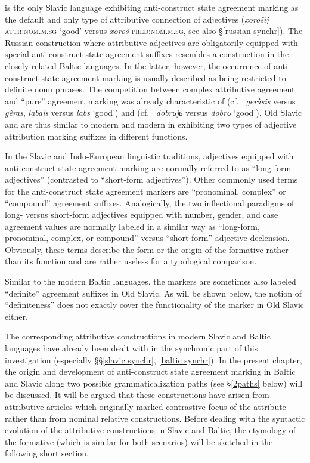  is the only Slavic language exhibiting anti\hyp{}construct state agreement marking as the default and only type of attributive connection of adjectives (\textit{xorošij} \textsc{attr:nom.m.sg} ‘good’ versus \textit{xoroš} \textsc{pred:nom.m.sg}, see also \S\ref{russian synchr}). The Russian construction where attributive adjectives are obligatorily equipped with special anti\hyp{}construct state agreement suffixes resembles a construction in the closely related Baltic languages. In the latter, however, the occurrence of anti\hyp{}construct state agreement marking is usually described as being restricted to definite noun phrases. The competition between complex attributive agreement and “pure” agreement marking was already characteristic of  (cf.~ \textit{geràsis} versus \textit{g{\~e}ras},  \textit{labais} versus \textit{labs} ‘good’) and  (cf.~ \textit{dobrъjь} versus \textit{dobrъ} ‘good’). Old Slavic and  are thus similar to modern  and modern  in exhibiting two types of adjective attribution marking suffixes in different functions.

In the Slavic and Indo-European linguistic traditions, adjectives equipped with anti\hyp{}construct state agreement marking are normally referred to as “long-form adjectives” (contrasted to “short-form adjectives”). Other commonly used terms for the anti\hyp{}construct state agreement markers are “pronominal, complex” or “compound” agreement suffixes. Analogically, the two inflectional paradigms of long- versus short-form adjectives equipped with number, gender, and case agreement values are normally labeled in a similar way as “long-form, pronominal, complex, or compound” versus “short-form” adjective declension. Obviously, these terms describe the form or the origin of the formative rather than its function and are rather useless for a typological comparison.

Similar to the modern Baltic languages, the markers are sometimes also labeled “definite” agreement suffixes in Old Slavic. As will be shown below, the notion of “definiteness” does not exactly cover the functionality of the marker in Old Slavic either.

The corresponding attributive constructions in modern Slavic and Baltic languages have already been dealt with in the synchronic part of this investigation (especially \S\S\ref{slavic synchr}, \ref{baltic synchr}). In the present chapter, the origin and development of anti\hyp{}construct state agreement marking in Baltic and Slavic along two possible grammaticalization paths (see \S\ref{2paths} below) will be discussed. It will be argued that these constructions have arisen from attributive articles which originally marked contrastive focus of the attribute rather than from nominal relative constructions. Before dealing with the syntactic evolution of the attributive constructions in Slavic and Baltic, the etymology of the formative (which is similar for both scenarios) will be sketched in the following short section.

